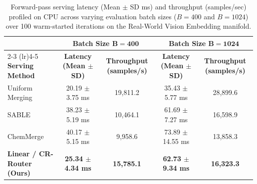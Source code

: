 \begin{table}[t]
\centering
\small
\caption{Forward-pass serving latency (Mean $\pm$ SD ms) and throughput (samples/sec) profiled on CPU across varying evaluation batch sizes ($B = 400$ and $B = 1024$) over 100 warm-started iterations on the Real-World Vision Embedding manifold.}
\vskip 0.15in
\label{tab:latency_results}
\begin{tabular*}{\textwidth}{@{\extracolsep{\fill}}lcccc}
\toprule
& \multicolumn{2}{c}{\textbf{Batch Size } $\boldsymbol{B = 400}$} & \multicolumn{2}{c}{\textbf{Batch Size } $\boldsymbol{B = 1024}$} \\
\cmidrule(lr){2-3} \cmidrule(lr){4-5}
\textbf{Serving Method} & \textbf{Latency (Mean $\pm$ SD)} & \textbf{Throughput (samples/s)} & \textbf{Latency (Mean $\pm$ SD)} & \textbf{Throughput (samples/s)} \\
\midrule
Uniform Merging & 20.19 $\pm$ 3.75 ms & 19,811.2 & 35.43 $\pm$ 5.77 ms & 28,899.6 \\
SABLE \cite{sable2025samplewise} & 38.23 $\pm$ 5.19 ms & 10,464.1 & 61.69 $\pm$ 7.27 ms & 16,598.9 \\
ChemMerge \cite{chemmerge2025kinetics} & 40.17 $\pm$ 5.15 ms & 9,958.6 & 73.89 $\pm$ 14.55 ms & 13,858.3 \\
\midrule
\textbf{Linear / CR-Router (Ours)} & \textbf{25.34 $\pm$ 4.34 ms} & \textbf{15,785.1} & \textbf{62.73 $\pm$ 9.34 ms} & \textbf{16,323.3} \\
\bottomrule
\end{tabular*}
\end{table}

